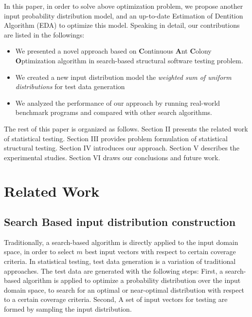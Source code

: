 \documentclass[journal]{IEEEtran}
\begin{document}
In this paper, in order to solve above optimization problem, we propose another input probability distribution model, and an up-to-date Estimation of Dentition Algorithm (EDA) to optimize this model. Speaking in detail, our contributions are listed in the followings:
\begin{itemize}
	\item We presented a novel approach based on \textbf{C}ontinuous \textbf{A}nt \textbf{C}olony \textbf{O}ptimization algorithm in search-based structural software testing problem.
	\item We created a new input distribution model the \emph{weighted sum of uniform distributions} for test data generation
	\item We analyzed the performance of our approach by running real-world benchmark programs and compared with other search algorithms.
\end{itemize}

The rest of this paper is organized as follows. Section II presents the related work of statistical testing. Section III provides problem formulation of statistical structural testing. Section IV introduces our approach. Section V describes the experimental studies. Section VI draws our conclusions and future work.\\

\section{Related Work}
\subsection{Search Based input distribution construction}
Traditionally, a search-based algorithm is directly applied to the input domain space, in order to select \(m\) best input vectors with respect to certain coverage criteria. In statistical testing, test data generation is a variation of traditional approaches. The test data are generated with the following steps: First, a search-based algorithm is applied to optimize a probability distribution over the input domain space, to search for an optimal or near-optimal distribution with respect to a certain coverage criteria. Second, A set of input vectors for testing are formed by sampling the input distribution. 
\end{document}
